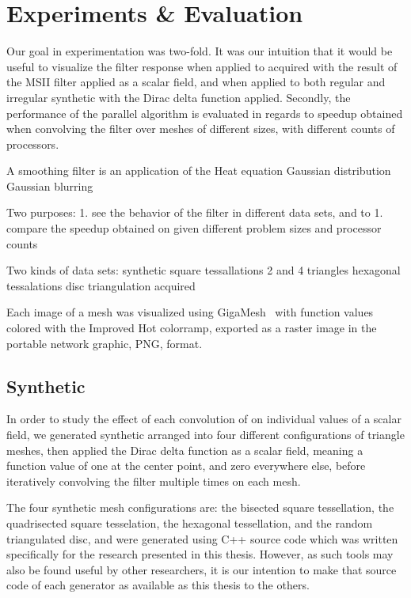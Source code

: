 \chapter{Experiments \& Evaluation}
Our goal in experimentation was two-fold. It was our intuition that it would be useful to visualize the filter response when applied to acquired \tdd{} with the result of the MSII filter applied as a scalar field, and when applied to both regular and irregular synthetic \tdd{} with the Dirac delta function applied. Secondly, the performance of the parallel algorithm is evaluated in regards to speedup obtained when convolving the filter over meshes of different sizes, with different counts of processors.

A smoothing filter is an application of the Heat equation 
Gaussian distribution
Gaussian blurring

Two purposes:
	1. see the behavior of the filter in different data sets, and to
	1. compare the speedup obtained on given different problem sizes and processor counts

Two kinds of data sets:
	synthetic
		square tessallations 2 and 4 triangles
		hexagonal tessalations
		disc triangulation
	acquired

Each image of a mesh was visualized using GigaMesh~\cite{Mara10} with function values colored with the Improved Hot colorramp, exported as a raster image in the portable network graphic, PNG, format.%


%
%
%
%
%
%
\section{Synthetic \tdd{}}
In order to study the effect of each convolution of  on individual values of a scalar field, we generated synthetic \tdd{} arranged into four different configurations of triangle meshes, then applied the Dirac delta function as a scalar field, meaning a function value of one at the center point, and zero everywhere else, before iteratively convolving the filter multiple times on each mesh.

The four synthetic mesh configurations are: the bisected square tessellation, the quadrisected square tesselation, the hexagonal tessellation, and the random triangulated disc, and were generated using C++ source code which was written specifically for the research presented in this thesis. However, as such tools may also be found useful by other researchers, it is our intention to make that source code of each generator as available as this thesis to the others.

